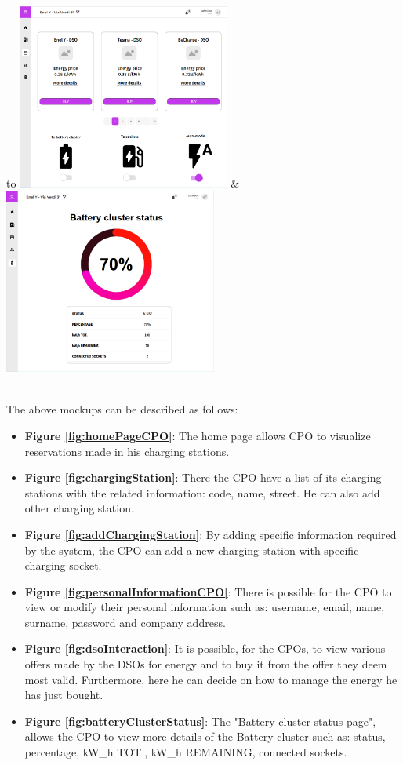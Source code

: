 \begin{table}[H]
\centering
\begin{tabu}to \textwidth {X[c]X[c]}
  \includegraphics[width=70mm]{images/dso.png}\label{fig:dsoInteraction} &
  \includegraphics[width=70mm]{images/battery.png}\label{fig:batteryClusterStatus} \\\\
\end{tabu}
\end{table}
The above mockups can be described as follows:
\begin{itemize}
    \item \textbf{Figure \ref{fig:homePageCPO}}: The home page allows CPO to visualize reservations made in his charging stations.
    \item \textbf{Figure \ref{fig:chargingStation}}: There the CPO have a list of its charging stations with the related information: code, name, street. He can also add other charging station.
    \item \textbf{Figure \ref{fig:addChargingStation}}: By adding specific information required by the system, the CPO can add a new charging station with specific charging socket.
    \item \textbf{Figure \ref{fig:personalInformationCPO}}: There is possible for the CPO to view or modify their personal information such as: username, email, name, surname, password and company address.
    \item \textbf{Figure \ref{fig:dsoInteraction}}: It is possible, for the CPOs, to view various offers made by the DSOs for energy and to buy it from the offer they deem most valid. Furthermore, here he can decide on how to manage the energy he has just bought.
    \item \textbf{Figure \ref{fig:batteryClusterStatus}}: The "Battery cluster status page", allows the CPO to view more details of the Battery cluster such as: status, percentage, kW\_h TOT.,  kW\_h REMAINING, connected sockets. 
\end{itemize}  
